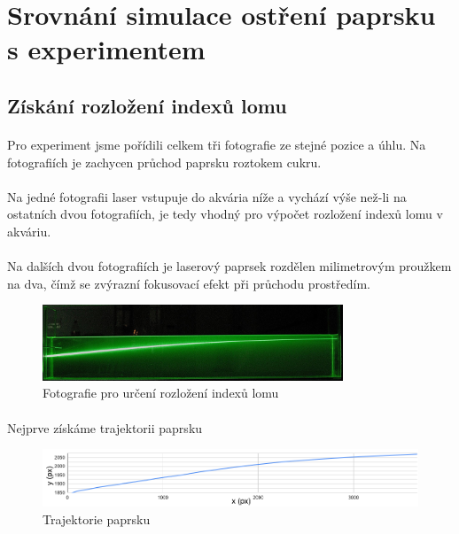 \documentclass[10pt,a4paper]{article}
\begin{document}
\newpage

\section{Srovnání simulace ostření paprsku s experimentem}

\subsection{Získání rozložení indexů lomu}
\paragraph{}
Pro experiment jsme pořídili celkem tři fotografie ze stejné pozice a úhlu. Na fotografiích je zachycen průchod paprsku roztokem cukru. 
\paragraph{}
Na jedné fotografii laser vstupuje do akvária níže a vychází výše než-li na ostatních dvou fotografiích, je tedy vhodný pro výpočet rozložení indexů lomu v akváriu.
\paragraph{}
Na dalších dvou fotografiích je laserový paprsek rozdělen milimetrovým proužkem na dva, čímž se zvýrazní fokusovací efekt při průchodu prostředím.

\begin{figure}[H]
\centering
    \includegraphics[width=0.8\textwidth]{image9.jpg}
    \caption{Fotografie pro určení rozložení indexů lomu}
    \label{fig:chart1}
\end{figure}

\paragraph{}
Nejprve získáme trajektorii paprsku

\begin{figure}[H]
\centering
    \includegraphics[width=\textwidth]{image4.png}
    \caption{Trajektorie paprsku}
    \label{fig:chart1}
\end{figure}
\end{document}
